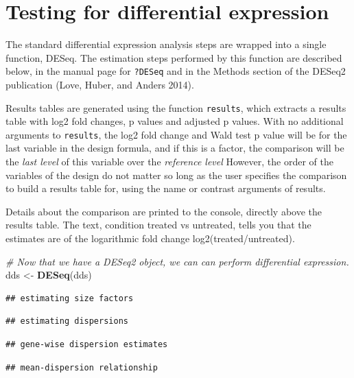 \documentclass[
]{book}
\newenvironment{Shaded}{\begin{snugshade}}{\end{snugshade}}
\newcommand{\CommentTok}[1]{\textcolor[rgb]{0.56,0.35,0.01}{\textit{#1}}}
\newcommand{\FunctionTok}[1]{\textcolor[rgb]{0.13,0.29,0.53}{\textbf{#1}}}
\newcommand{\NormalTok}[1]{#1}
\newcommand{\OtherTok}[1]{\textcolor[rgb]{0.56,0.35,0.01}{#1}}
\begin{document}
\hypertarget{testing-for-differential-expression-1}{%
\section{Testing for differential expression}\label{testing-for-differential-expression-1}}

The standard differential expression analysis steps are wrapped into a single function, DESeq. The estimation steps performed by this function are described below, in the manual page for \texttt{?DESeq} and in the Methods section of the DESeq2 publication (Love, Huber, and Anders 2014).

Results tables are generated using the function \texttt{results}, which extracts a results table with log2 fold changes, p values and adjusted p values. With no additional arguments to \texttt{results}, the log2 fold change and Wald test p value will be for the last variable in the design formula, and if this is a factor, the comparison will be the \emph{last level} of this variable over the \emph{reference level} However, the order of the variables of the design do not matter so long as the user specifies the comparison to build a results table for, using the name or contrast arguments of results.

Details about the comparison are printed to the console, directly above the results table. The text, condition treated vs untreated, tells you that the estimates are of the logarithmic fold change log2(treated/untreated).

\begin{Shaded}
\begin{Highlighting}[]
\CommentTok{\# Now that we have a DESeq2 object, we can can perform differential expression.}
\NormalTok{dds }\OtherTok{\textless{}{-}} \FunctionTok{DESeq}\NormalTok{(dds)}
\end{Highlighting}
\end{Shaded}

\begin{verbatim}
## estimating size factors
\end{verbatim}

\begin{verbatim}
## estimating dispersions
\end{verbatim}

\begin{verbatim}
## gene-wise dispersion estimates
\end{verbatim}

\begin{verbatim}
## mean-dispersion relationship
\end{verbatim}
\end{document}
